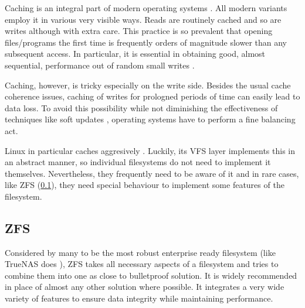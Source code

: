 
            Caching is an integral part of modern operating systems
            \cite{IO_bottleneck} \cite{LFS} \cite{FFS}. All modern variants
            employ it in various very visible ways. Reads are routinely cached
            and so are writes although with extra care. This practice is so
            prevalent that opening files/programs the first time is frequently
            orders of magnitude slower than any subsequent access. In
            particular, it is essential in obtaining good, almost sequential,
            performance out of random small writes \cite{soft_updates}.

            Caching, however, is tricky especially on the write side. Besides
            the usual cache coherence issues, caching of writes for prologned
            periods of time can easily lead to data loss. To avoid this
            possibility while not diminishing the effectiveness of techniques
            like soft updates \cite{soft_updates}, operating systems have to
            perform a fine balancing act.

            Linux in particular caches aggresively \cite{Linux_VFS_cache}.
            Luckily, its VFS layer implements this in an abstract manner, so
            individual filesystems do not need to implement it themselves.
            Nevertheless, they frequently need to be aware of it and in rare
            cases, like ZFS (\ref{sec_ZFS}), they need special behaviour to
            implement some features of the filesystem.

        \subsection{ZFS}
            \label{sec_ZFS}

            Considered by many to be the most robust enterprise ready
            filesystem (like TrueNAS does \cite{TrueNAS_enterprise}), ZFS takes
            all necessary aspects of a filesystem and tries to combine them
            into one as close to bulletproof solution. It is widely recommended
            in place of almost any other solution where possible. It integrates
            a very wide variety of features to ensure data integrity while
            maintaining performance.

